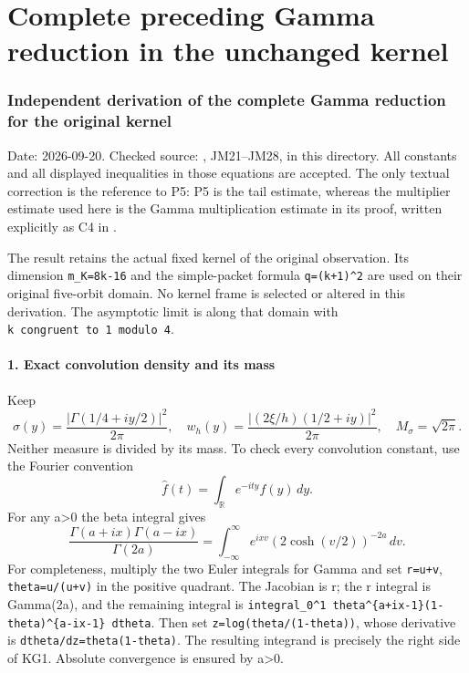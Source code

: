 \documentclass[11pt]{article}
\begin{document}
\endgroup

\clearpage\begingroup
\part*{Complete preceding Gamma reduction in the unchanged kernel}
\providecommand{\mrkgtightlist}{\setlength{\itemsep}{0pt}\setlength{\parskip}{0pt}}

\section{Independent derivation of the complete Gamma reduction for the original kernel}\label{mrkg:independent-derivation-of-the-complete-gamma-reduction-for-the-original-kernel}

Date: 2026-09-20. Checked source: , JM21--JM28, in this directory. All constants and all displayed inequalities in those equations are accepted. The only textual correction is the reference to P5: P5 is the tail estimate, whereas the multiplier estimate used here is the Gamma multiplication estimate in its proof, written explicitly as C4 in .

The result retains the actual fixed kernel of the original observation. Its dimension \texttt{m\_K=8k-16} and the simple-packet formula \texttt{q=(k+1)\^{}2} are used on their original five-orbit domain. No kernel frame is selected or altered in this derivation. The asymptotic limit is along that domain with \texttt{k\ congruent\ to\ 1\ modulo\ 4}.

\subsection{1. Exact convolution density and its mass}\label{mrkg:exact-convolution-density-and-its-mass}

Keep \[
\sigma(y)=\frac{|\Gamma(1/4+iy/2)|^2}{2\pi},\quad
w_h(y)=\frac{|(2\xi/h)(1/2+iy)|^2}{2\pi},\quad
M_\sigma=\sqrt{2\pi}.
\] Neither measure is divided by its mass. To check every convolution constant, use the Fourier convention \[
\widehat f(t)=\int_{\mathbb R}e^{-ity}f(y)\,dy.
\] For any a\textgreater0 the beta integral gives \[
\frac{\Gamma(a+ix)\Gamma(a-ix)}{\Gamma(2a)}
=\int_{-\infty}^{\infty}e^{ixv}(2\cosh(v/2))^{-2a}\,dv.
\tag{KG1}
\] For completeness, multiply the two Euler integrals for Gamma and set \texttt{r=u+v}, \texttt{theta=u/(u+v)} in the positive quadrant. The Jacobian is r; the r integral is Gamma(2a), and the remaining integral is \texttt{integral\_0\^{}1\ theta\^{}\{a+ix-1\}(1-theta)\^{}\{a-ix-1\}\ dtheta}. Then set \texttt{z=log(theta/(1-theta))}, whose derivative is \texttt{dtheta/dz=theta(1-theta)}. The resulting integrand is precisely the right side of KG1. Absolute convergence is ensured by a\textgreater0.
\end{document}
